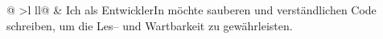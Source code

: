 \begin{longtable}[c]{@{}
	>{}l ll@{}}
	\midrule
	 &
	\multicolumn{1}{p{0.9\textwidth}}
	{Ich als EntwicklerIn möchte sauberen und verständlichen Code schreiben, um die Les-- und Wartbarkeit zu gewährleisten.}\\
	\bottomrule {}
	\vspace{0.1cm}\\
	\noalign{\hspace{0.0525\textwidth}\grayRule}
	\caption{Anforderungen aus Entwicklungsperspektive}
	\label{tab:dev}\\
\end{longtable}